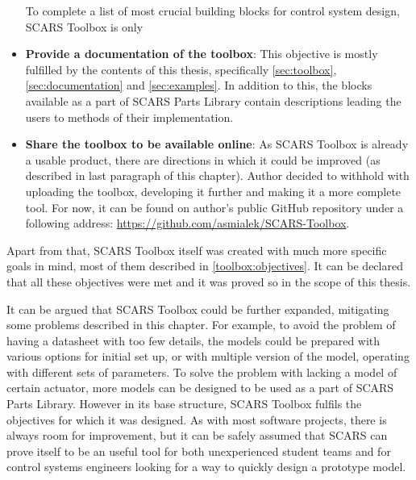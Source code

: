 \begin{itemize}
        To complete a list of most crucial building blocks for control system design, SCARS Toolbox is only
        \item \textbf{Provide a documentation of the toolbox}: This objective is mostly fulfilled by the contents of this thesis, specifically \autoref{sec:toolbox}, \autoref{sec:documentation} and \autoref{sec:examples}. In addition to this, the blocks available as a part of SCARS Parts Library contain descriptions leading the users to methods of their implementation. 
        \item \textbf{Share the toolbox to be available online}: As SCARS Toolbox is already a usable product, there are directions in which it could be improved (as described in last paragraph of this chapter). Author decided to withhold with uploading the toolbox, developing it further and making it a more complete tool. For now, it can be found on author's public GitHub repository under a following address: \url{https://github.com/asmialek/SCARS-Toolbox}.
    \end{itemize}

    Apart from that, SCARS Toolbox itself was created with much more specific goals in mind, most of them described in \autoref{toolbox:objectives}. It can be declared that all these objectives were met and it was proved so in the scope of this thesis.

    It can be argued that SCARS Toolbox could be further expanded, mitigating some problems described in this chapter. For example, to avoid the problem of having a datasheet with too few details, the models could be prepared with various options for initial set up, or with multiple version of the model, operating with different sets of parameters. To solve the problem with lacking a model of certain actuator, more models can be designed to be used as a part of SCARS Parts Library. However in its base structure, SCARS Toolbox fulfils the objectives for which it was designed. As with most software projects, there is always room for improvement, but it can be safely assumed that SCARS can prove itself to be an useful tool for both unexperienced student teams and for control systems engineers looking for a way to quickly design a prototype model. 




